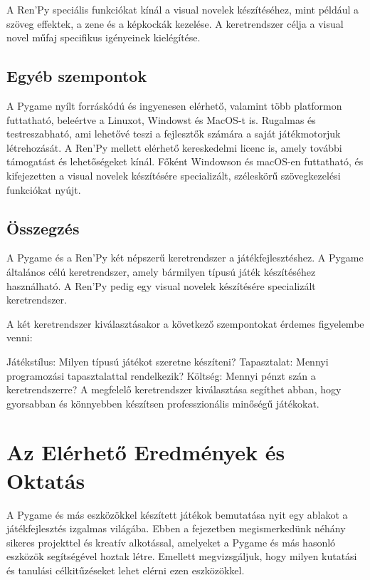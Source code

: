 A Ren'Py speciális funkciókat kínál a visual novelek készítéséhez, mint például a szöveg effektek, a zene és a képkockák kezelése. A keretrendszer célja a visual novel műfaj specifikus igényeinek kielégítése.

\subsection{Egyéb szempontok}

A Pygame nyílt forráskódú és ingyenesen elérhető, valamint több platformon futtatható, beleértve a Linuxot, Windowst és MacOS-t is. Rugalmas és testreszabható, ami lehetővé teszi a fejlesztők számára a saját játékmotorjuk létrehozását.
A Ren'Py mellett elérhető kereskedelmi licenc is, amely további támogatást és lehetőségeket kínál. Főként Windowson és macOS-en futtatható, és kifejezetten a visual novelek készítésére specializált, széleskörű szövegkezelési funkciókat nyújt.

\subsection{Összegzés}

A Pygame és a Ren'Py két népszerű keretrendszer a játékfejlesztéshez. A Pygame általános célú keretrendszer, amely bármilyen típusú játék készítéséhez használható. A Ren'Py pedig egy visual novelek készítésére specializált keretrendszer.

A két keretrendszer kiválasztásakor a következő szempontokat érdemes figyelembe venni:

Játékstílus: Milyen típusú játékot szeretne készíteni?
Tapasztalat: Mennyi programozási tapasztalattal rendelkezik?
Költség: Mennyi pénzt szán a keretrendszerre?
A megfelelő keretrendszer kiválasztása segíthet abban, hogy gyorsabban és könnyebben készítsen professzionális minőségű játékokat.

\section{Az Elérhető Eredmények és Oktatás}

A Pygame és más eszközökkel készített játékok bemutatása nyit egy ablakot a játékfejlesztés izgalmas világába. Ebben a fejezetben megismerkedünk néhány sikeres projekttel és kreatív alkotással, amelyeket a Pygame és más hasonló eszközök segítségével hoztak létre. Emellett megvizsgáljuk, hogy milyen kutatási és tanulási célkitűzéseket lehet elérni ezen eszközökkel.

